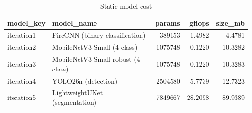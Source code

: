 \begin{table}
\caption{Static model cost}
\begin{tabular}{llrrr}
\toprule
model\_key & model\_name & params & gflops & size\_mb \\
\midrule
iteration1 & FireCNN (binary classification) & 389153 & 1.4982 & 4.4781 \\
iteration2 & MobileNetV3-Small (4-class) & 1075748 & 0.1220 & 10.3282 \\
iteration3 & MobileNetV3-Small robust (4-class) & 1075748 & 0.1220 & 10.3283 \\
iteration4 & YOLO26n (detection) & 2504580 & 5.7739 & 12.7323 \\
iteration5 & LightweightUNet (segmentation) & 7849667 & 28.2098 & 89.9389 \\
\bottomrule
\end{tabular}
\end{table}
